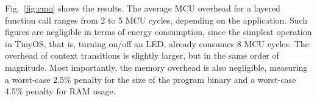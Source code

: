 
 Fig.~\ref{fig:cmo} shows the results. The average MCU overhead
for a layered function call ranges from 2 to 5 MCU cycles, depending on the
application. Such figures are negligible in terms of energy consumption, since
the simplest operation in TinyOS, that is, turning on/off an LED, already
consumes 8 MCU cycles. The overhead of context transitions is slightly larger,
but in the same order of magnitude. Most importantly, the memory overhead is
also negligible, measuring a worst-case 2.5\% penalty for the size of the
program binary and a worst-case 4.5\% penalty for RAM usage.



